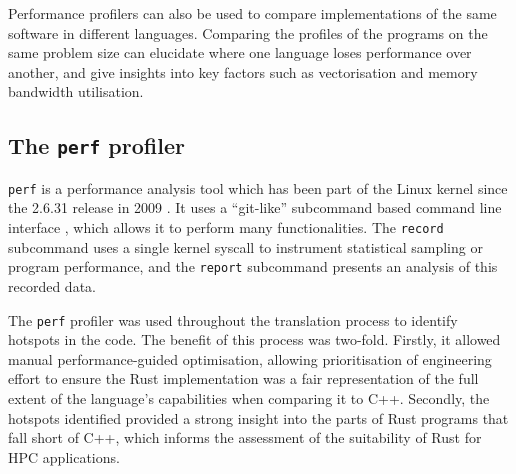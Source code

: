 Performance profilers can also be used to compare implementations of the same software in different languages. Comparing the  profiles of the programs on the same problem size can elucidate where one language loses performance over another, and give insights into key factors such as vectorisation and memory bandwidth utilisation.



\subsection{The \texttt{perf} profiler}
\label{ssec:perf-profiler}

\texttt{perf} is a performance analysis tool which has been part of the Linux kernel since the 2.6.31 release in 2009 \cite{PerfcountersAddedMainline}. It uses a ``git-like'' subcommand based command line interface  \cite{de2010new}, which allows it to perform many functionalities. The \texttt{record} subcommand uses a single kernel syscall to instrument statistical sampling or program performance, and the \texttt{report} subcommand presents an analysis of this recorded data.

The \texttt{perf} profiler was used throughout the translation process to identify hotspots in the code. The benefit of this process was two-fold. Firstly, it allowed manual performance-guided optimisation, allowing prioritisation of engineering effort to ensure the Rust implementation was a fair representation of the full extent of the language's capabilities when comparing it to C++. Secondly, the hotspots identified provided a strong insight into the parts of Rust programs that fall short of C++, which informs the assessment of the suitability of Rust for \acrshort{HPC} applications.


